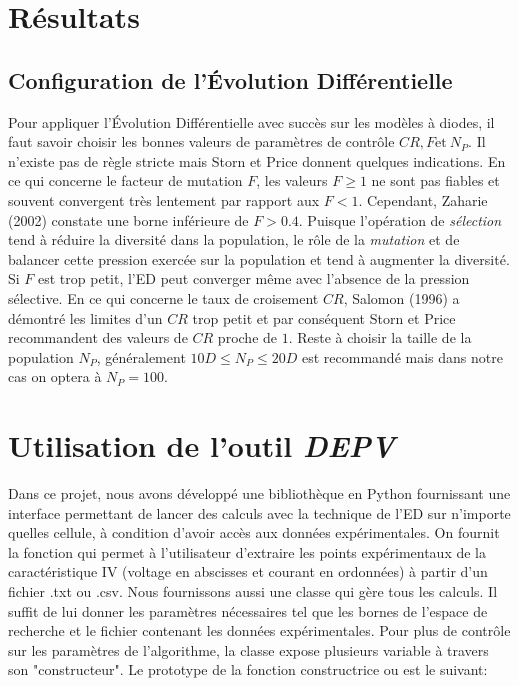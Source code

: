 \section{Résultats}

\subsection{Configuration de l'Évolution Différentielle}
Pour appliquer l'Évolution Différentielle avec succès sur les modèles à diodes, il faut savoir choisir les bonnes valeurs de paramètres de contrôle $CR, F \text{et}\  N_P$. Il n'existe pas de règle stricte mais Storn et Price \cite{Price2005} donnent quelques indications. En ce qui concerne le facteur de mutation $F$, les valeurs $F \geq 1$ ne sont pas fiables et souvent convergent très lentement par rapport aux $F < 1$. Cependant, Zaharie (2002) \cite{Zaharie2002} constate une borne inférieure de $F > 0.4$. Puisque l'opération de \textit{sélection} tend à réduire la diversité dans la population, le rôle de la \textit{mutation} et de balancer cette pression exercée sur la population et tend à augmenter la diversité. Si $F$ est trop petit, l'ED peut converger même avec l'absence de la pression sélective. En ce qui concerne le taux de croisement $CR$, Salomon (1996) \cite{Salomon1996} a démontré les limites d'un $CR$ trop petit et par conséquent Storn et Price recommandent des valeurs de $CR$ proche de $1$. Reste à choisir la taille de la population $N_P$, généralement $10D \leq N_P \leq 20D$ est recommandé mais dans notre cas on optera à $N_P = 100$.


\section{Utilisation de l'outil \textit{DEPV}}
Dans ce projet, nous avons développé une bibliothèque en Python fournissant une interface permettant de lancer des calculs avec la technique de l'ED sur n'importe quelles cellule, à condition d'avoir accès aux données expérimentales. On fournit la fonction  qui permet à l'utilisateur d'extraire les points expérimentaux de la caractéristique IV (voltage en abscisses et courant en ordonnées) à partir d'un fichier .txt ou .csv. Nous fournissons aussi une classe  qui gère tous les calculs. Il suffit de lui donner les paramètres nécessaires tel que les bornes de l'espace de recherche et le fichier contenant les données expérimentales. Pour plus de contrôle sur les paramètres de l'algorithme, la classe  expose plusieurs variable à travers son "constructeur". Le prototype de la fonction constructrice ou  est le suivant:

